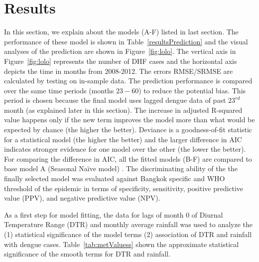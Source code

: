 \documentclass{bmcart}
\begin{document}
\section{Results} \label{results}

In this section, we explain about the models (A-F) listed in last section. The performance of these model is shown in Table~\ref{resultsPrediction} and the visual analyses of the prediction are shown in Figure~\ref{fig:lolo}. The vertical axis in Figure~\ref{fig:lolo} represents the number of DHF cases and the horizontal axis depicts the time in months from 2008-2012. The errors RMSE/SRMSE are calculated by testing on in-sample data. The prediction performance is compared over the same time periods (months $23-60$) to reduce the potential bias. This period is chosen because the final model uses lagged dengue data of past  $23^{rd}$ month (as explained later in this section). The increase in adjusted R-squared value happens only if the new term improves the model more than what would be expected by chance (the higher the better). Deviance is a goodness-of-fit statistic for a statistical model (the higher the better) and the larger difference in AIC indicates stronger evidence for one model over the other (the lower the better). For comparing  the difference in AIC, all the fitted models (B-F) are compared to base model A (Seasonal Na\"{i}ve model) .  The discriminating ability of the the finally selected model was evaluated against Bangkok specific and WHO threshold of the epidemic in terms of specificity, sensitivity, positive predictive value (PPV), and negative predictive value (NPV).



As a first step for model fitting, the data for lags of month 0 of Diurnal Temperature Range (DTR) and monthly average rainfall was used to analyze the (1) statistical significance of the model terms (2) association of DTR and rainfall with dengue cases. Table~\ref{tab:metValuess} shown the approximate statistical significance of the smooth terms for DTR and rainfall. 
\end{document}
